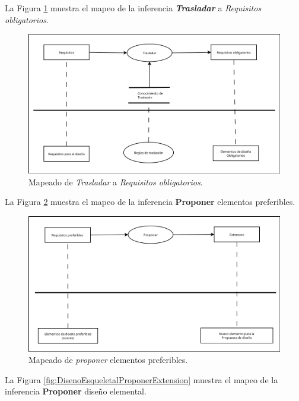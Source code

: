 La Figura \ref{fig:TrasladarObligatorios} muestra el mapeo de la inferencia \textbf{\textit{Trasladar}} a \textit{Requisitos obligatorios}.

\begin{figure}[H]
  \centering
  \includegraphics[scale=0.35]{imaxes/TrasladarObligatorios.png}
  \caption{\label{fig:TrasladarObligatorios}Mapeado de \textit{Trasladar} a \textit{Requisitos obligatorios}.}
\end{figure}

La Figura \ref{fig:PreferiblesProponerExtension} muestra el mapeo de la inferencia \textbf{Proponer} elementos preferibles.

\begin{figure}[H]
  \centering
  \includegraphics[scale=0.35]{imaxes/PreferiblesProponerExtension.png}
  \caption{\label{fig:PreferiblesProponerExtension}Mapeado de \textit{proponer} elementos preferibles.}
\end{figure}
 
La Figura \ref{fig:DisenoEsqueletalProponerExtension} muestra el mapeo de la inferencia \textbf{Proponer} diseño elemental.

